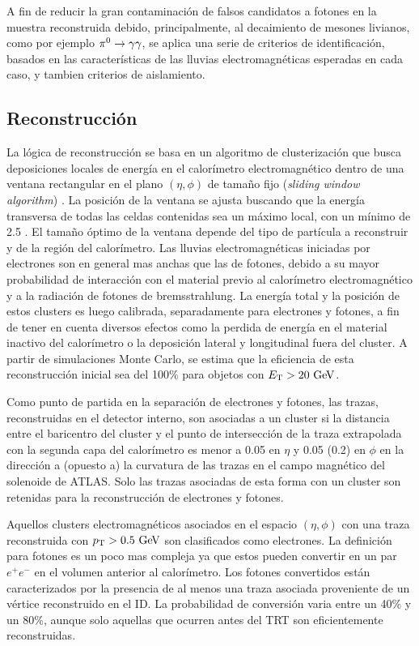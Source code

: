 A fin de reducir la gran contaminación de falsos candidatos a fotones en la
muestra reconstruida debido, principalmente, al decaimiento de mesones livianos,
como por ejemplo $\pi^0 \to \gam\gam$, se aplica una serie de criterios de
identificación, basados en las características de las lluvias electromagnéticas
esperadas en cada caso, y tambien criterios de aislamiento.


\subsection{Reconstrucción}

La lógica de reconstrucción se basa en un algoritmo de clusterización que busca
deposiciones locales de energía en el calorímetro electromagnético dentro de una
ventana rectangular en el plano $(\eta, \phi)$ de tamaño fijo (\emph{sliding
  window algorithm}) \cite{Delmastro:1747242}. La posición de la ventana se
ajusta buscando que la energía transversa de todas las celdas contenidas sea un
máximo local, con un mínimo de 2.5 \gev. El tamaño óptimo de la ventana depende
del tipo de partícula a reconstruir y de la región del calorímetro. Las lluvias
electromagnéticas iniciadas por electrones son en general mas anchas que las de
fotones, debido a su mayor probabilidad de interacción con el material previo al
calorímetro electromagnético y a la radiación de fotones de bremsstrahlung. La
energía total y la posición de estos clusters es luego calibrada, separadamente
para electrones y fotones, a fin de tener en cuenta diversos efectos como la
perdida de energía en el material inactivo del calorímetro o la deposición
lateral y longitudinal fuera del cluster. A partir de simulaciones Monte Carlo,
se estima que la eficiencia de esta reconstrucción inicial sea del 100\% para
objetos con $\et > 20 \gev$.

Como punto de partida en la separación de electrones y fotones, las trazas,
reconstruidas en el detector interno, son asociadas a un cluster si la distancia
entre el baricentro del cluster y el punto de intersección de la traza
extrapolada con la segunda capa del calorímetro es menor a 0.05 en $\eta$ y 0.05
(0.2) en $\phi$ en la dirección a (opuesto a) la curvatura de las trazas en el
campo magnético del solenoide de ATLAS. Solo las trazas asociadas de esta forma
con un cluster son retenidas para la reconstrucción de electrones y fotones.

Aquellos clusters electromagnéticos asociados en el espacio $(\eta,\phi)$ con
una traza reconstruida con $\pt > 0.5 \gev$ son clasificados como electrones. La
definición para fotones es un poco mas compleja ya que estos pueden convertir en
un par $e^+e^-$ en el volumen anterior al calorímetro. Los fotones convertidos
están caracterizados por la presencia de al menos una traza asociada proveniente
de un vértice reconstruido en el ID. La probabilidad de conversión varia entre
un 40\% y un 80\%, aunque solo aquellas que ocurren antes del TRT son
eficientemente reconstruidas.

